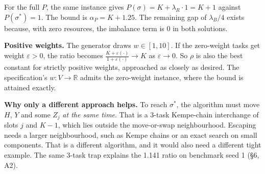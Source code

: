 For the full $P$, the same instance gives
$P(\sigma)=K+\lambda_R\cdot1=K+1$ against $P(\sigma^\ast)=1$. The bound is
$\alpha_P=K+1.25$. The remaining gap of $\lambda_B/4$ exists because,
with zero resources, the imbalance term is 0 in both solutions.

\textbf{Positive weights.} The generator draws $w\in[1,10]$. If the
zero-weight tasks get weight $\varepsilon>0$, the ratio becomes
$\frac{K+\varepsilon(\cdot)}{1+\varepsilon(\cdot)}\to K$ as
$\varepsilon\to0$. So $\rho$ is also the best constant for strictly
positive weights, approached as closely as desired. The specification's
$w:V\to\mathbb{R}$ admits the zero-weight instance, where the bound is
attained exactly.

\textbf{Why only a different approach helps.} To reach $\sigma^\ast$, the
algorithm must move $H$, $Y$ and some $Z_j$ \emph{at the same time}. That
is a 3-task Kempe-chain interchange of slots $j$ and $K{-}1$, which lies
outside the move-or-swap neighbourhood. Escaping needs a larger
neighbourhood, such as Kempe chains or an exact search on small
components. That is a different algorithm, and it would also need a
different tight example. The same 3-task trap
explains the 1.141 ratio on benchmark seed 1 (\S6, A2).

